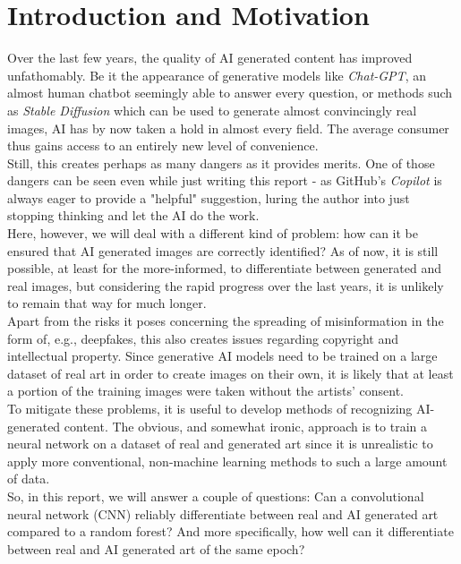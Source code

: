 \chapter{Introduction and Motivation}
\label{ch:intro}

Over the last few years, the quality of AI generated content has improved unfathomably.
Be it the appearance of generative models like \textit{Chat-GPT}, an almost human chatbot seemingly able to answer every question,
or methods such as \textit{Stable Diffusion} which can be used to generate almost convincingly real images, 
AI has by now taken a hold in almost every field. 
The average consumer thus gains access to an entirely new level of convenience. \\

Still, this creates perhaps as many dangers as it provides merits.
One of those dangers can be seen even while just writing this report - as GitHub's \textit{Copilot} is always eager to provide a "helpful" suggestion,
luring the author into just stopping thinking and let the AI do the work. \\

Here, however, we will deal with a different kind of problem: how can it be ensured that AI generated images are correctly identified?
As of now, it is still possible, at least for the more-informed, to differentiate between generated and real images, but considering the rapid progress over the last years,
it is unlikely to remain that way for much longer. \\ %

Apart from the risks it poses concerning the spreading of misinformation in the form of, e.g., deepfakes, this also creates issues regarding copyright and intellectual property.
Since generative AI models need to be trained on a large dataset of real art in order to create images on their own, it is likely that at least a portion of the training images
were taken without the artists' consent. \\

To mitigate these problems, it is useful to develop methods of recognizing AI-generated content.
The obvious, and somewhat ironic, approach is to train a neural network on a dataset of real and generated art
since it is unrealistic to apply more conventional, non-machine learning methods to such a large amount of data. \\

So, in this report, we will answer a couple of questions: Can a convolutional neural network (CNN) reliably differentiate between real and AI generated art compared to a random forest?
And more specifically, how well can it differentiate between real and AI generated art of the same epoch? \\






